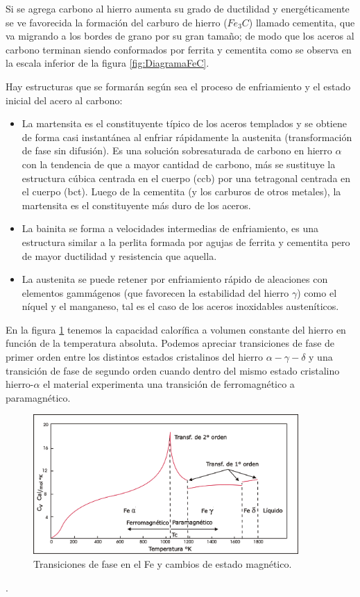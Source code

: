 Si se agrega carbono al hierro aumenta su grado de ductilidad y energéticamente se ve favorecida la formación del carburo de hierro ($Fe_{3}C$) llamado cementita, que va migrando a los bordes de grano por su gran tamaño; de modo que los aceros al carbono terminan siendo conformados por ferrita y cementita como se observa en la escala inferior de la figura \ref{fig:DiagramaFeC}.

Hay estructuras que se formarán según sea el proceso de enfriamiento y el estado inicial del acero al carbono:  
\begin{itemize}
	\item La martensita es el constituyente típico de los aceros templados y se obtiene de forma casi instantánea al enfriar rápidamente la austenita (transformación de fase sin difusión). Es una solución sobresaturada de carbono en hierro $\alpha$ con la tendencia de que a mayor cantidad de carbono, más se sustituye la estructura cúbica centrada en el cuerpo (ccb) por una tetragonal centrada en el cuerpo (bct). Luego de la cementita (y los carburos de otros metales), la martensita es el constituyente más duro de los aceros.

	\item La bainita se forma a velocidades intermedias de enfriamiento, es una estructura similar a la perlita formada por agujas de ferrita y cementita pero de mayor ductilidad y resistencia que aquella.

	\item La austenita se puede retener por enfriamiento rápido de aleaciones con elementos gammágenos (que favorecen la estabilidad del hierro $\gamma$) como el níquel y el manganeso, tal es el caso de los aceros inoxidables austeníticos.
\end{itemize}

En la figura \ref{fig:FerromagnetismoParticularidad1} tenemos la capacidad calorífica a volumen constante del hierro en función de la temperatura absoluta. Podemos apreciar transiciones de fase de primer orden entre los distintos estados cristalinos del hierro $\alpha-\gamma-\delta$ y una transición de fase de segundo orden cuando dentro del mismo estado cristalino hierro-$\alpha$ el material experimenta una transición de ferromagnético a paramagnético.

\begin{figure}[h]
	\centering
	\includegraphics[width=0.90\textwidth]{./Figures/FerromagnetismoParticularidad1.jpg}
	\caption{Transiciones de fase en el Fe y cambios de estado magnético.}
	\label{fig:FerromagnetismoParticularidad1}
\end{figure}.



